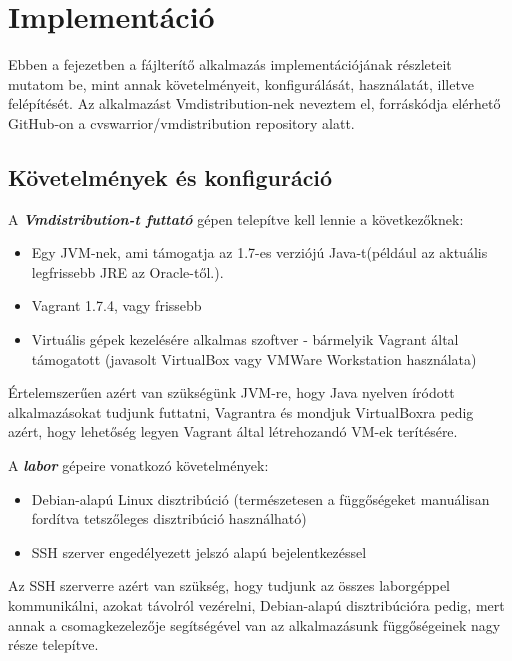 \chapter{Implementáció}
\label{chp:implementation}
Ebben a fejezetben a fájlterítő alkalmazás implementációjának részleteit mutatom be, mint annak követelményeit, konfigurálását, használatát, illetve felépítését.
Az alkalmazást Vmdistribution-nek neveztem el, forráskódja elérhető GitHub-on a cvswarrior/vmdistribution repository alatt\cite{vmdistribution}.

\section{Követelmények és konfiguráció}

A \textit{\textbf{Vmdistribution-t futtató}} gépen telepítve kell lennie a következőknek:
\begin{itemize}
  \item Egy JVM-nek\cite{stark2001java}, ami támogatja az 1.7-es verziójú Java-t(például az aktuális legfrissebb JRE az Oracle-től\cite{oraclejre}.).
  \item Vagrant 1.7.4, vagy frissebb
  \item Virtuális gépek kezelésére alkalmas szoftver - bármelyik Vagrant által támogatott\cite{vagrantproviders} (javasolt VirtualBox vagy VMWare Workstation használata)
\end{itemize}
Értelemszerűen azért van szükségünk JVM-re, hogy Java nyelven íródott alkalmazásokat tudjunk futtatni, Vagrantra és mondjuk VirtualBoxra pedig azért, hogy lehetőség legyen Vagrant által létrehozandó VM-ek terítésére.

A \textit{\textbf{labor}} gépeire vonatkozó követelmények:
\begin{itemize}
  \item Debian-alapú Linux disztribúció (természetesen a függőségeket manuálisan fordítva tetszőleges disztribúció használható)
  \item SSH szerver engedélyezett jelszó alapú bejelentkezéssel
\end{itemize}
Az SSH szerverre azért van szükség, hogy tudjunk az összes laborgéppel kommunikálni, azokat távolról vezérelni, Debian-alapú disztribúcióra pedig, mert annak a csomagkezelezője segítségével van az alkalmazásunk függőségeinek nagy része telepítve.

